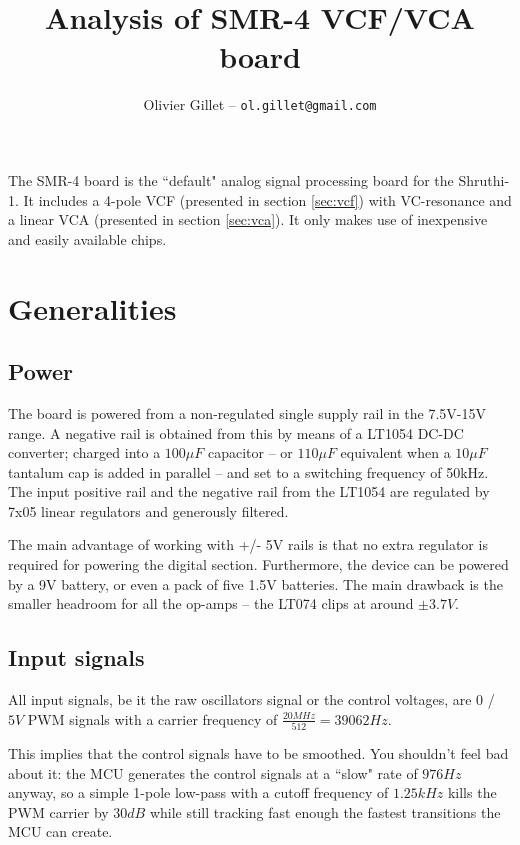 \documentclass[a4paper,11pt]{article}
\title{Analysis of SMR-4 VCF/VCA board}
\author{Olivier Gillet -- \tt ol.gillet@gmail.com}
\date{}
\begin{document}
\maketitle

The SMR-4 board is the ``default" analog signal processing board for the  Shruthi-1. It includes a 4-pole VCF (presented in section \ref{sec:vcf}) with VC-resonance and a linear VCA (presented in section \ref{sec:vca}). It only makes use of inexpensive and easily available chips.

\section{Generalities}

\subsection{Power}

The board is powered from a non-regulated single supply rail in the 7.5V-15V range. A negative rail is obtained from this by means of a LT1054 DC-DC converter; charged into a $100\mu F$ capacitor -- or $110\mu F$ equivalent when a $10\mu F$ tantalum cap is added in parallel -- and set to a switching frequency of 50kHz. The input positive rail and the negative rail from the LT1054 are regulated by 7x05 linear regulators and generously filtered.

The main advantage of working with +/- 5V rails is that no extra regulator is required for powering the digital section. Furthermore, the device can be powered by a 9V battery, or even a pack of five 1.5V batteries. The main drawback is the smaller headroom for all the op-amps -- the LT074 clips at around $\pm 3.7V$.

\subsection{Input signals}

All input signals, be it the raw oscillators signal or the control voltages, are $0$ / $5V$ PWM signals with a carrier frequency of $\frac{20MHz}{512} = 39062 Hz$.

This implies that the control signals have to be smoothed. You shouldn't feel bad about it: the MCU generates the control signals at a ``slow" rate of $976 Hz$ anyway, so a simple 1-pole low-pass with a cutoff frequency of $1.25 kHz$ kills the PWM carrier by $30dB$ while still tracking fast enough the fastest transitions the MCU can create.
\end{document}
